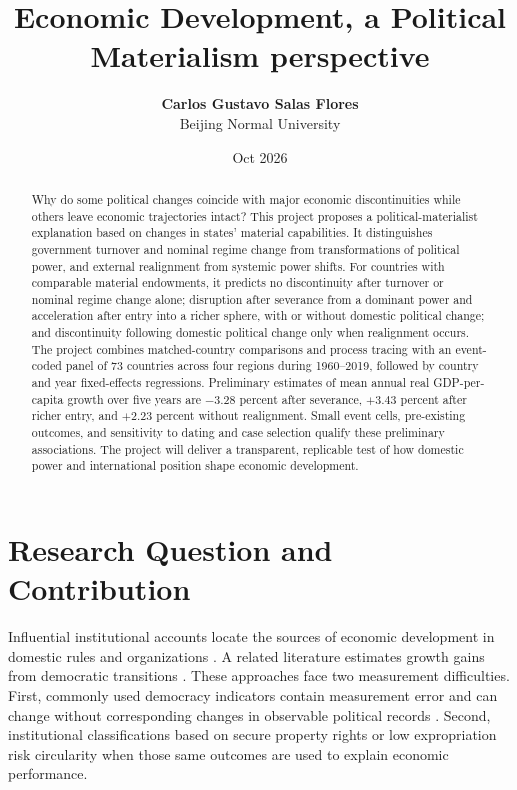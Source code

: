 \documentclass[11pt]{article}
\title{\textbf{Economic Development, a Political Materialism perspective}}
\author{\textbf{Carlos Gustavo Salas Flores} \\ \small Beijing Normal University}
\date{Oct 2026}
\begin{document}
\maketitle

\begin{abstract}
Why do some political changes coincide with major economic discontinuities while others leave economic trajectories intact? This project proposes a political-materialist explanation based on changes in states' material capabilities. It distinguishes government turnover and nominal regime change from transformations of political power, and external realignment from systemic power shifts. For countries with comparable material endowments, it predicts no discontinuity after turnover or nominal regime change alone; disruption after severance from a dominant power and acceleration after entry into a richer sphere, with or without domestic political change; and discontinuity following domestic political change only when realignment occurs. The project combines matched-country comparisons and process tracing with an event-coded panel of 73 countries across four regions during 1960--2019, followed by country and year fixed-effects regressions. Preliminary estimates of mean annual real GDP-per-capita growth over five years are $-3.28$ percent after severance, $+3.43$ percent after richer entry, and $+2.23$ percent without realignment. Small event cells, pre-existing outcomes, and sensitivity to dating and case selection qualify these preliminary associations. The project will deliver a transparent, replicable test of how domestic power and international position shape economic development.
\end{abstract}

\section{Research Question and Contribution}

Influential institutional accounts locate the sources of economic development in domestic rules and organizations \parencite{acemoglu_johnson_robinson_2001,acemoglu_johnson_robinson_2005,acemoglu_robinson_2012}. A related literature estimates growth gains from democratic transitions \parencite{acemoglu_naidu_restrepo_robinson_2019}. These approaches face two measurement difficulties. First, commonly used democracy indicators contain measurement error and can change without corresponding changes in observable political records \parencite{treier_jackman_2008,little_meng_2024}. Second, institutional classifications based on secure property rights or low expropriation risk circularity when those same outcomes are used to explain economic performance.
\end{document}
